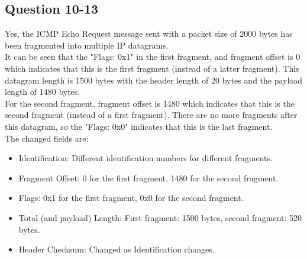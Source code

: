 \documentclass{article}
\begin{document}
\begin{CJK*}{UTF8}{gbsn}
\subsection{Question 10-13}
Yes, the ICMP Echo Request message sent with a packet size of 2000 bytes has been fragmented into multiple IP datagrams.
\\It can be seen that the "Flags: 0x1" in the first fragment, and fragment offset is 0 which indicates that this is the first fragment (instead of a latter fragment).
This datagram length is 1500 bytes with the header length of 20 bytes and the payload length of 1480 bytes.
\\For the second fragment, fragment offset is 1480 which indicates that this is the second fragment (instead of a first fragment). There are no more
fragments after this datagram, so the "Flags: 0x0" indicates that this is the last fragment.
\\The changed fields are:
\begin{itemize}
    \item Identification: Different identification numbers for different fragments.
    \item Fragment Offset: 0 for the first fragment, 1480 for the second fragment.
    \item Flags: 0x1 for the first fragment, 0x0 for the second fragment.
    \item Total (and payload) Length: First fragment: 1500 bytes, second fragment: 520 bytes.
    \item Header Checksum: Changed as Identification changes.
\end{itemize}


\end{CJK*}
\end{document}

